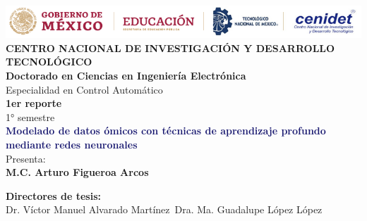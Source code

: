 \begin{titlepage}
    \begin{center}
        \noindent \includegraphics[width=\textwidth]{logos latex.PNG} \\[2cm] %
        \textbf{{\Huge CENTRO NACIONAL DE INVESTIGACIÓN Y DESARROLLO TECNOLÓGICO}}\\[1cm]
        
        \textbf{\Large{Doctorado en Ciencias en Ingeniería Electrónica}}\\
        {\large Especialidad en Control Automático}\\[1cm]
        
        \textbf{{\Large 1er reporte}}\\
        {\large 1° semestre}\\[1cm]
              
        \textbf{\Large{\textcolor{MidnightBlue}{Modelado de datos ómicos con técnicas de aprendizaje profundo mediante redes neuronales}}}\\[1cm]
        
        {\large Presenta:}\\
        \textbf{{\Large M.C. Arturo Figueroa Arcos}}\\[1cm]
    
    \end{center}
    
    
    \begin{minipage}{0.46\textwidth}										
    \begin{flushleft}														
    \begin{center}
    
            \textbf{Directores de tesis:}\\
         
            Dr. Víctor Manuel Alvarado Martínez\
            Dra. Ma. Guadalupe López López\\
            
    \end{center}
    \end{flushleft}
    \end{minipage}		
    \begin{minipage}{0.52\textwidth}		
    \vspace{0cm}
    \begin{flushright}															%
    \begin{center}
    

\end{center}
\end{flushright}
\end{minipage}
\end{titlepage}
